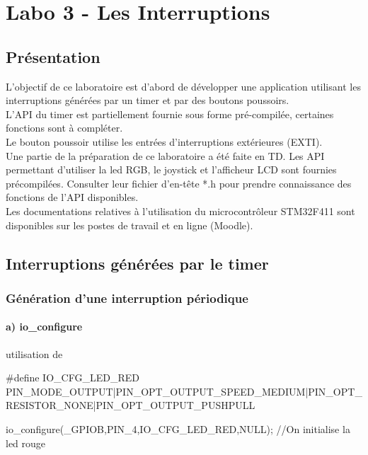 \part{Labo 3 - Les Interruptions}
\chapter{Présentation}

L'objectif de ce laboratoire est d'abord de développer une application utilisant les interruptions générées par un timer et par des boutons poussoirs. \\

L'API du timer est partiellement fournie sous forme pré-compilée, certaines fonctions sont à compléter.\\
Le bouton poussoir utilise les entrées d'interruptions extérieures (EXTI). \\

Une partie de la préparation de ce laboratoire a été
faite en TD. Les API permettant d'utiliser la led RGB, le joystick et l'afficheur LCD sont fournies précompilées. Consulter leur fichier d'en-tête *.h pour prendre connaissance des fonctions de l'API disponibles. \\

Les documentations relatives à l'utilisation du microcontrôleur STM32F411 sont disponibles sur les postes de travail et en ligne (Moodle).

\chapter{Interruptions générées par le timer}

\section{Génération d'une interruption périodique}

\subsection{a) io\_configure}


\begin{Cpp}{utilisation de } 

#define IO_CFG_LED_RED  PIN_MODE_OUTPUT|PIN_OPT_OUTPUT_SPEED_MEDIUM|PIN_OPT_RESISTOR_NONE|PIN_OPT_OUTPUT_PUSHPULL

io_configure(_GPIOB,PIN_4,IO_CFG_LED_RED,NULL); //On initialise la led rouge
    
    
\end{Cpp}

